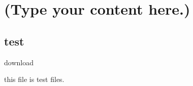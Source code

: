 \documentclass{book}
\begin{document}
\chapter{(Type your content here.)}
\section{test}

download 

this file is test files.
\end{document}
